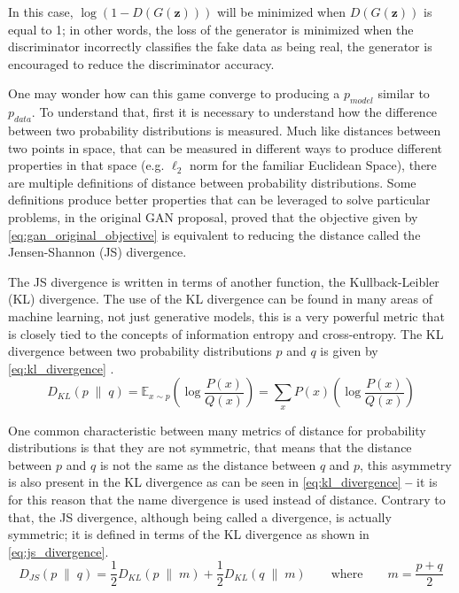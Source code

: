 In this case, $\log(1 - D(G(\bm{z})))$ will be minimized when $D(G(\bm{z}))$ is equal to 1; in other words, the loss of the generator is minimized when the discriminator incorrectly classifies the fake data as being real, the generator is encouraged to reduce the discriminator accuracy.

One may wonder how can this game converge to producing a $p_{model}$ similar to $p_{data}$. To understand that, first it is necessary to understand how the difference between two probability distributions is measured. Much like distances between two points in space, that can be measured in different ways to produce different properties in that space (e.g. $\ell_2$ norm for the familiar Euclidean Space), there are multiple definitions of distance between probability distributions. Some definitions produce better properties that can be leveraged to solve particular problems, in the original \gls{GAN} proposal, \textcite{gans2014} proved that the objective given by \autoref{eq:gan_original_objective} is equivalent to reducing the distance called the Jensen-Shannon (JS) divergence.

The JS divergence is written in terms of another function, the Kullback-Leibler (KL) divergence. The use of the KL divergence can be found in many areas of machine learning, not just generative models, this is a very powerful metric that is closely tied to the concepts of information entropy and cross-entropy. The KL divergence between two probability distributions $p$ and $q$ is given by \autoref{eq:kl_divergence} \cite[p. 71-72]{deepLearningBook2016}.
\begin{equation} \label{eq:kl_divergence}
    D_{KL}(p \;\|\; q) =
    \mathbb{E}_{x\sim p}\left( \log\frac{P(x)}{Q(x)} \right) = 
    \sum_{x}{P(x)\left( \log\frac{P(x)}{Q(x)} \right)}
\end{equation}

One common characteristic between many metrics of distance for probability distributions is that they are not symmetric, that means that the distance between $p$ and $q$ is not the same as the distance between $q$ and $p$, this asymmetry is also present in the KL divergence as can be seen in \autoref{eq:kl_divergence} \textbf{--} it is for this reason that the name divergence is used instead of distance. Contrary to that, the JS divergence, although being called a divergence, is actually symmetric; it is defined in terms of the KL divergence as shown in \autoref{eq:js_divergence}.
\begin{equation} \label{eq:js_divergence}
    D_{JS}(p \;\|\; q) = \frac{1}{2}D_{KL}(p \;\|\; m) + \frac{1}{2}D_{KL}(q \;\|\; m) \qquad \text{where} \qquad
    m = \frac{p + q}{2}
\end{equation}

